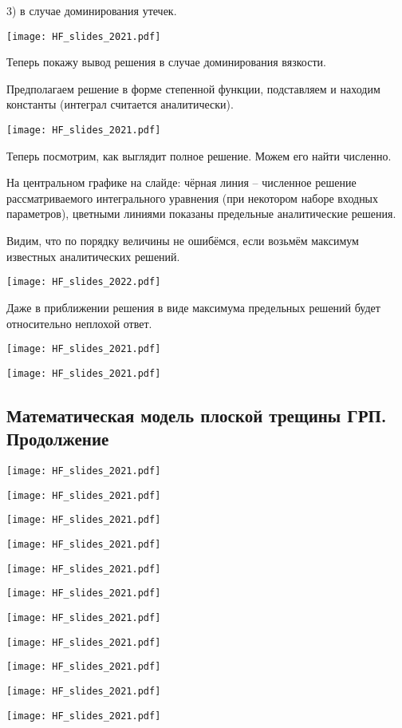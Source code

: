 \documentclass[main.tex]{subfiles}
\begin{document}
3) в случае доминирования утечек.

\texttt{[image: HF\_slides\_2021.pdf]}

Теперь покажу вывод решения в случае доминирования вязкости.

Предполагаем решение в форме степенной функции, подставляем и находим константы (интеграл считается аналитически).

\texttt{[image: HF\_slides\_2021.pdf]}

Теперь посмотрим, как выглядит полное решение.
Можем его найти численно.

На центральном графике на слайде: чёрная линия -- численное решение рассматриваемого интегрального уравнения (при некотором наборе входных параметров), цветными линиями показаны предельные аналитические решения.

Видим, что по порядку величины не ошибёмся, если возьмём максимум известных аналитических решений.

\texttt{[image: HF\_slides\_2022.pdf]}

Даже в приближении решения в виде максимума предельных решений будет относительно неплохой ответ.

\texttt{[image: HF\_slides\_2021.pdf]}

\texttt{[image: HF\_slides\_2021.pdf]}

\subsection{Математическая модель плоской трещины ГРП. Продолжение}

\texttt{[image: HF\_slides\_2021.pdf]}

\texttt{[image: HF\_slides\_2021.pdf]}

\texttt{[image: HF\_slides\_2021.pdf]}

\texttt{[image: HF\_slides\_2021.pdf]}

\texttt{[image: HF\_slides\_2021.pdf]}

\texttt{[image: HF\_slides\_2021.pdf]}

\texttt{[image: HF\_slides\_2021.pdf]}

\texttt{[image: HF\_slides\_2021.pdf]}

\texttt{[image: HF\_slides\_2021.pdf]}

\texttt{[image: HF\_slides\_2021.pdf]}

\texttt{[image: HF\_slides\_2021.pdf]}
\end{document}
